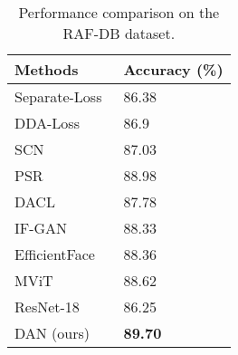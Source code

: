 \documentclass{article}
\begin{document}
\begin{table}[]
\caption{Performance comparison on the RAF-DB dataset.}
\label{table:rafdb}
\begin{tabularx}{\textwidth}{CC}
    \toprule
	\textbf{Methods}        & \textbf{Accuracy (\%)}\\ 
	\midrule
	Separate-Loss~\cite{li2019separate}          & 86.38   \\
    DDA-Loss~\cite{farzaneh2020discriminant}       & 86.9              \\
    SCN~\cite{wang2020suppressing}            & 87.03              \\
    PSR~\cite{vo2020pyramid}            & 88.98        \\
    DACL~\cite{farzaneh2021facial}           & 87.78             \\
    IF-GAN~\cite{cai2021identity}         & 88.33              \\
    EfficientFace~\cite{zhao2021robust}  & 88.36             \\
    MViT~\cite{li2021mvit}            & 88.62          \\
	\midrule
	ResNet-18         & 86.25   \\
	DAN (ours)       & \textbf{{89.70} }                     \\
    \bottomrule
\end{tabularx}
\end{table}
\end{document}
